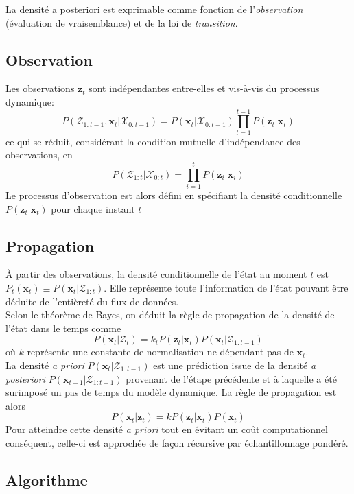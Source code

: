 \documentclass[a4paper,12pt]{report}
\begin{document}
La densité a posteriori est exprimable comme fonction de l'\textit{observation} (évaluation de vraisemblance) et de la loi de \textit{transition}.

\subsection{Observation}
Les observations $\mathbf{z}_t$ sont indépendantes entre-elles et vis-à-vis du processus dynamique:
$$P(\mathcal{Z}_{1:t-1},\mathbf{x}_t|\mathcal{X}_{0:t-1}) = P(\mathbf{x}_t|\mathcal{X}_{0:t-1})\prod_{t=1}^{t-1} P(\mathbf{z}_t|\mathbf{x}_t)$$
ce qui se réduit, considérant la condition mutuelle d'indépendance des observations, en
$$P(\mathcal{Z}_{1:t}|\mathcal{X}_{0:t}) = \prod_{i=1}^{t} P(\mathbf{z}_i|\mathbf{x}_i)$$
Le processus d'observation est alors défini en spécifiant la densité conditionnelle $P(\mathbf{z}_t|\mathbf{x}_t)$ pour chaque instant $t$

\subsection{Propagation}
\`{A} partir des observations, la densité conditionnelle de l'état au moment $t$ est $P_t(\mathbf{x}_t) \equiv P(\mathbf{x}_t|\mathcal{Z}_ {1:t})$. Elle représente toute l'information de l'état pouvant être déduite de l'entièreté du flux de données.\\
Selon le théorème de Bayes, on déduit la règle de propagation de la densité de l'état dans le temps comme  
$$P(\mathbf{x}_{t}|\mathcal{Z}_{t}) = k_t P(\mathbf{z}_t|\mathbf{x}_t)P(\mathbf{x}_t|\mathcal{Z}_{1:t-1})$$
où $k$ représente une constante de normalisation ne dépendant pas de $\mathbf{x}_t$.\\
La densité \textit{a priori} $P(\mathbf{x}_t|\mathcal{Z}_{1:t-1})$ est une prédiction issue de la densité \textit{a posteriori} $P(\mathbf{x}_{t-1}|\mathcal{Z}_{1:t-1})$ provenant de l'étape précédente et à laquelle a été surimposé un pas de temps du modèle dynamique.
La règle de propagation est alors $$P(\mathbf{x}_t|\mathbf{z}_t) = kP(\mathbf{z}_t|\mathbf{x}_t)P(\mathbf{x}_t)$$
Pour atteindre cette densité \textit{a priori} tout en évitant un coût computationnel conséquent, celle-ci est approchée de façon récursive par échantillonnage pondéré.\\
\pagebreak
\subsection{Algorithme}
\end{document}
